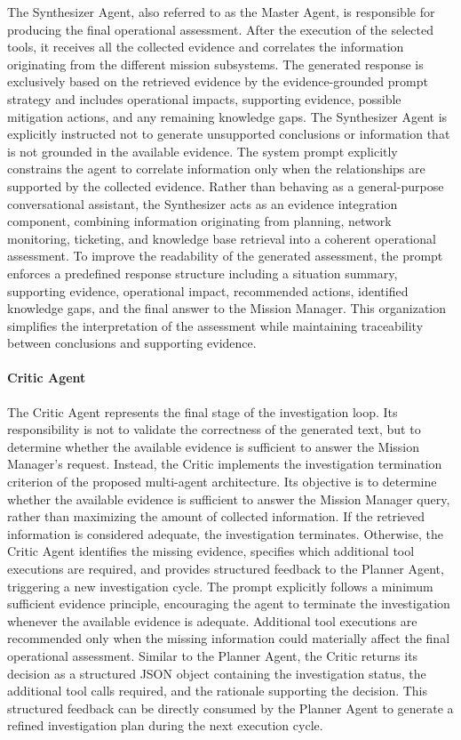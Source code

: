 The Synthesizer Agent, also referred to as the Master Agent, is responsible for producing the final operational assessment. After the execution of the selected tools, it receives all the collected evidence and correlates the information originating from the different mission subsystems. The generated response is exclusively based on the retrieved evidence by the evidence-grounded prompt strategy and includes operational impacts, supporting evidence, possible mitigation actions, and any remaining knowledge gaps. The Synthesizer Agent is explicitly instructed not to generate unsupported conclusions or information that is not grounded in the available evidence.
The system prompt explicitly constrains the agent to correlate information only when the relationships are supported by the collected evidence. Rather than behaving as a general-purpose conversational assistant, the Synthesizer acts as an evidence integration component, combining information originating from planning, network monitoring, ticketing, and knowledge base retrieval into a coherent operational assessment.
To improve the readability of the generated assessment, the prompt enforces a predefined response structure including a situation summary, supporting evidence, operational impact, recommended actions, identified knowledge gaps, and the final answer to the Mission Manager. This organization simplifies the interpretation of the assessment while maintaining traceability between conclusions and supporting evidence.

\paragraph{Critic Agent}

The Critic Agent represents the final stage of the investigation loop. Its responsibility is not to validate the correctness of the generated text, but to determine whether the available evidence is sufficient to answer the Mission Manager's request. Instead, the Critic implements the investigation termination criterion of the proposed multi-agent architecture. Its objective is to determine whether the available evidence is sufficient to answer the Mission Manager query, rather than maximizing the amount of collected information.
If the retrieved information is considered adequate, the investigation terminates. Otherwise, the Critic Agent identifies the missing evidence, specifies which additional tool executions are required, and provides structured feedback to the Planner Agent, triggering a new investigation cycle.
The prompt explicitly follows a minimum sufficient evidence principle, encouraging the agent to terminate the investigation whenever the available evidence is adequate. Additional tool executions are recommended only when the missing information could materially affect the final operational assessment.
Similar to the Planner Agent, the Critic returns its decision as a structured JSON object containing the investigation status, the additional tool calls required, and the rationale supporting the decision. This structured feedback can be directly consumed by the Planner Agent to generate a refined investigation plan during the next execution cycle.



